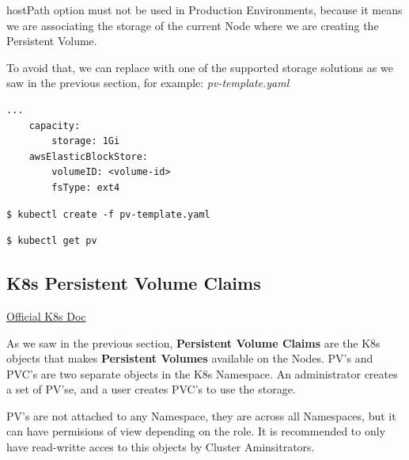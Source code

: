 \documentclass{article}
\newenvironment{blocktemplateIII}[1]{%
    \tcolorbox[beamer,%
    noparskip,breakable,
    ,colframe=Red,%
    colbacklower=LimeGreen!75!LightGreen,%
    title=#1]}%
    {\endtcolorbox}
\newenvironment{codetemplate}[1][]{%
  \mybasecolorbox[#1]
  \itshape
}{%
  \endmybasecolorbox
}
\begin{document}
\begin{blocktemplateIII}{WARNING}
hostPath option must not be used in Production Environments, because it means we are associating the storage of the current Node where we are creating the Persistent Volume.

To avoid that, we can replace with one of the supported storage solutions as we saw in the previous section, for example:
\begin{codetemplate}{pv-template.yaml}
\begin{verbatim}
...
    capacity:
        storage: 1Gi
    awsElasticBlockStore:
        volumeID: <volume-id>
        fsType: ext4
\end{verbatim}
\end{codetemplate}

\end{blocktemplateIII}

\begin{codetemplate}{}
\begin{verbatim}
$ kubectl create -f pv-template.yaml
\end{verbatim}
\end{codetemplate}

\begin{codetemplate}{}
\begin{verbatim}
$ kubectl get pv
\end{verbatim}
\end{codetemplate}

\subsection{K8s Persistent Volume Claims}

\href{https://kubernetes.io/docs/concepts/storage/persistent-volumes/#persistentvolumeclaims}{Official K8s Doc}

As we saw in the previous section, \textbf{Persistent Volume Claims} are the K8s objects that makes \textbf{Persistent Volumes} available on the Nodes. PV's and PVC's are two separate objects in the K8s Namespace. An administrator creates a set of PV'se, and a user creates PVC's to use the storage.

\begin{blocktemplateIII}{WARNING}
PV's are not attached to any Namespace, they are across all Namespaces, but it can have permisions of view depending on the role. It is recommended to only have read-writte acces to this objects by Cluster Aminsitrators.
\end{blocktemplateIII}
\end{document}
